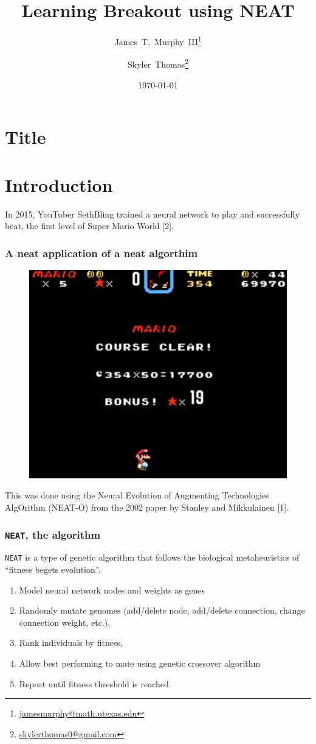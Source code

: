 \documentclass[t,pdflatex]{beamer}
\title{Learning Breakout using NEAT}
\author{James~T.~Murphy~III\thanks{\url{jamesmurphy@math.utexas.edu}}\and{}Skyler~Thomas\thanks{\url{skylerthomas0@gmail.com}}}
\institute{The University of Texas at Austin}
\date\today
\begin{document}
\section{Title}

    \begin{frame}

        \titlepage

    \end{frame}

\section{Introduction}
    \begin{frame}

        In 2015, YouTuber SethBling trained a neural network to play and successfully beat, the first level of Super Mario World [2].
        \frametitle{A neat application of a neat algorthim}
        \begin{figure}
            \centering
            \includegraphics[width=.54 \textwidth]{mario.png}
        \end{figure}

        This was done using the Neural Evolution of Augmenting Technologies AlgOrithm (NEAT-O) from the 2002 paper by Stanley and Mikkulainen [1].

    \end{frame}

    \begin{frame}

        \frametitle{\texttt{NEAT}, the algorithm}
        \texttt{NEAT} is a type of genetic algorithm that follows the biological metaheuristics of ``fitness begets evolution''.
        \begin{enumerate}[1]
            \item Model neural network nodes and weights as genes
            \item Randomly mutate genomes (add/delete node, add/delete connection, change connection weight,  etc.),
            \item Rank individuals by fitness,
            \item Allow best performing to mate using genetic crossover algorithm
            \item Repeat until fitness threshold is reached.
        \end{enumerate}

    \end{frame}
\end{document}
